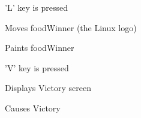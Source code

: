 \begin{DoxyItemize}
\begin{DoxyItemize}
\begin{DoxyItemize}
\end{DoxyItemize}
\item '\-L' key is pressed
\begin{DoxyItemize}
\item \-Moves food\-Winner (the \-Linux logo)
\item \-Paints food\-Winner
\end{DoxyItemize}
\item '\-V' key is pressed
\begin{DoxyItemize}
\item \-Displays \-Victory screen
\item \-Causes \-Victory 
\end{DoxyItemize}
\end{DoxyItemize}
\end{DoxyItemize}